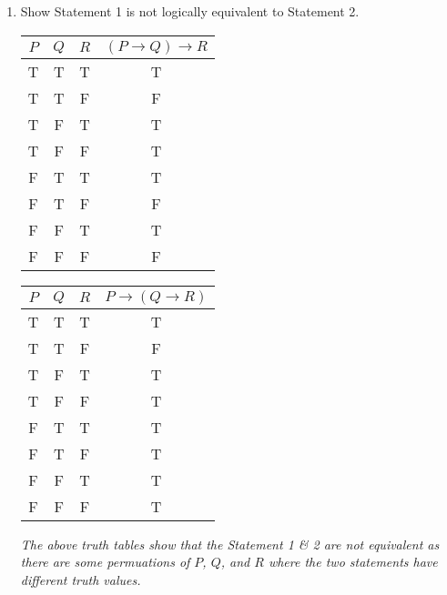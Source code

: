 \documentclass[11pt]{amsart}
\begin{document}
\begin{spacing}{1.2}
\begin{enumerate}
\begin{enumerate}
\vspace{1em}
\emph{
    The above truth tables show that the Statement 2 \& 3 are equivalent as for each permuation of $P$, $Q$, and $R$ the two statements have the same truth value.
}


\vfill
\item Show  Statement 1 is not logically equivalent to Statement 2.

\vspace{1em}
\begin{minipage}{0.45\textwidth}
    \centering
    \begin{tabular}{c|c|c|c}
        $P$ & $Q$ & $R$ & $(P \rightarrow Q) \rightarrow R$ \\
        \hline
        T & T & T & T \\
        T & T & F & F \\
        T & F & T & T \\
        T & F & F & T \\
        F & T & T & T \\
        F & T & F & F \\
        F & F & T & T \\
        F & F & F & F
    \end{tabular}
\end{minipage}
\hfill
\begin{minipage}{0.45\textwidth}
    \centering
    \begin{tabular}{c|c|c|c}
        $P$ & $Q$ & $R$ & $P \rightarrow (Q \rightarrow R)$ \\
        \hline
        T & T & T & T \\
        T & T & F & F \\
        T & F & T & T \\
        T & F & F & T \\
        F & T & T & T \\
        F & T & F & T \\
        F & F & T & T \\
        F & F & F & T
    \end{tabular}
\end{minipage}

\vspace{1em}
\emph{
    The above truth tables show that the Statement 1 \& 2 are not equivalent as there are some permuations of $P$, $Q$, and $R$ where the two statements have different truth values.
}

\vfill
\end{enumerate}


\end{enumerate}
\end{spacing}
\end{document}
